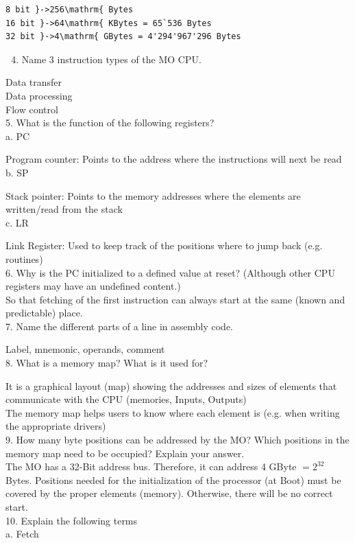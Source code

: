 \documentclass[10pt]{article}
\begin{document}
\begin{verbatim}
8 bit }->256\mathrm{ Bytes
16 bit }->64\mathrm{ KBytes = 65`536 Bytes
32 bit }->4\mathrm{ GBytes = 4'294'967'296 Bytes
\end{verbatim}

\begin{enumerate}
  \setcounter{enumi}{3}
  \item Name 3 instruction types of the MO CPU.
\end{enumerate}

Data transfer\\
Data processing\\
Flow control\\
5. What is the function of the following registers?\\
a. PC

Program counter: Points to the address where the instructions will next be read\\
b. SP

Stack pointer: Points to the memory addresses where the elements are written/read from the stack\\
c. LR

Link Register: Used to keep track of the positions where to jump back (e.g. routines)\\
6. Why is the PC initialized to a defined value at reset? (Although other CPU registers may have an undefined content.)\\
So that fetching of the first instruction can always start at the same (known and predictable) place.\\
7. Name the different parts of a line in assembly code.

Label, mnemonic, operands, comment\\
8. What is a memory map? What is it used for?

It is a graphical layout (map) showing the addresses and sizes of elements that communicate with the CPU (memories, Inputs, Outputs)\\
The memory map helps users to know where each element is (e.g. when writing the appropriate drivers)\\
9. How many byte positions can be addressed by the MO? Which positions in the memory map need to be occupied? Explain your answer.\\
The MO has a 32-Bit address bus. Therefore, it can address 4 GByte $=2^{32}$ Bytes. Positions needed for the initialization of the processor (at Boot) must be covered by the proper elements (memory). Otherwise, there will be no correct start.\\
10. Explain the following terms\\
a. Fetch
\end{document}
